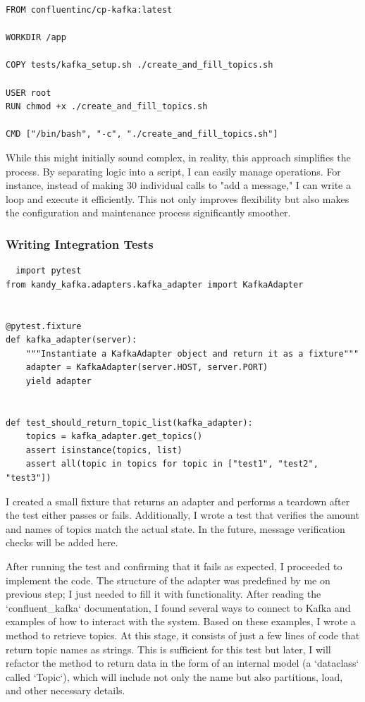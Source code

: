\documentclass[10pt , a4paper]{report}
\newenvironment{code}{\captionsetup{type=listing}}{}
\begin{document}
\begin{code}
  \begin{verbatim}
FROM confluentinc/cp-kafka:latest

WORKDIR /app

COPY tests/kafka_setup.sh ./create_and_fill_topics.sh

USER root
RUN chmod +x ./create_and_fill_topics.sh

CMD ["/bin/bash", "-c", "./create_and_fill_topics.sh"]

  \end{verbatim}
\end{code}

While this might initially sound complex, in reality, this approach simplifies the process. By separating logic into a script, I can easily manage operations. For instance, instead of making 30 individual calls to "add a message," I can write a loop and execute it efficiently. This not only improves flexibility but also makes the configuration and maintenance process significantly smoother.

\subsubsection{Writing Integration Tests}

\begin{code}
  \begin{verbatim}
  import pytest
from kandy_kafka.adapters.kafka_adapter import KafkaAdapter


@pytest.fixture
def kafka_adapter(server):
    """Instantiate a KafkaAdapter object and return it as a fixture"""
    adapter = KafkaAdapter(server.HOST, server.PORT)
    yield adapter


def test_should_return_topic_list(kafka_adapter):
    topics = kafka_adapter.get_topics()
    assert isinstance(topics, list)
    assert all(topic in topics for topic in ["test1", "test2", "test3"])
  \end{verbatim}
\end{code}

I created a small fixture that returns an adapter and performs a teardown after the test either passes or fails. Additionally, I wrote a test that verifies the amount and names of topics match the actual state. In the future, message verification checks will be added here.

After running the test and confirming that it fails as expected, I proceeded to implement the code. The structure of the adapter was predefined by me on previous step; I just needed to fill it with functionality. After reading the `confluent\_kafka` documentation, I found several ways to connect to Kafka and examples of how to interact with the system. Based on these examples, I wrote a method to retrieve topics. At this stage, it consists of just a few lines of code that return topic names as strings. This is sufficient for this test but later, I will refactor the method to return data in the form of an internal model (a `dataclass` called `Topic`), which will include not only the name but also partitions, load, and other necessary details.
\end{document}
